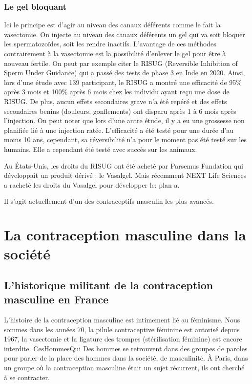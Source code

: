 \documentclass[12pt,a4paper]{report}
\begin{document}
\subsection{Le gel bloquant}

Ici le principe est d'agir au niveau des canaux déférents comme le fait la vasectomie. On injecte au niveau des canaux déférents un gel qui va soit bloquer les spermatozoïdes, soit les rendre inactifs.
L'avantage de ces méthodes contrairement à la vasectomie est la possibilité d'enlever le gel pour être à nouveau fertile.
On peut par exemple citer le RISUG (Reversible Inhibition of Sperm Under Guidance) qui a passé des tests de phase 3 en Inde en 2020. \cite{ContraceptionMasculineScience}
Ainsi, lors d'une étude avec 139 participant, le RISUG a montré une efficacité de 95\% après 3 mois et 100\% après 6 mois chez les individu ayant reçu une dose de RISUG. De plus, aucun effets secondaires grave n'a été repéré et des effets secondaires benins (douleurs, gonflements) ont disparu après 1 à 6 mois après l'injection. \cite{sharmaSafetyEfficacyIntravasal2019}
On peut noter que lors d'une autre étude, il y a eu une grossesse non planifiée lié à une injection ratée. \cite{RisugWikipedia}
L'efficacité a été testé pour une durée d'au moins 10 ans, cependant, sa réversibilité n'a pour le moment pas été testé sur les humains. Elle a cependant été testé avec succès sur les animaux. \cite{khilwaniRISUGMaleContraceptive2020}

Au États-Unis, les droits du RISUG ont été acheté par Parsemus Fundation qui développait un produit dérivé : le Vasalgel. Mais récemment NEXT Life Sciences a racheté les droits du Vasalgel pour développer le: plan a. \cites{ReversibleInhibitionSperm}{VasalgelMaleContraceptive}{PlanReversibleMale}

Il s'agit actuellement d'un des contraceptifs masculin les plus avancés. \cite{ContraceptionMasculineScience}

\chapter{La contraception masculine dans la société}

\section{L'historique militant de la contraception masculine en France} \label{section:militant}

L'histoire de la contraception masculine est intimement lié au féminisme.
Nous sommes dans les années 70, la pilule contraceptive féminine est autorisé depuis 1967, la vasectomie et la ligature des trompes (stérilisation féminine) est encore interdite. \cite{guillaumedaudinContraceptesEnqueteDernier2022}{CesHommesQui}
Des hommes se retrouvent dans des groupes de paroles pour parler de la place des hommes dans la société, de masculinité.
À Paris, dans un groupe où la contraception masculine était un sujet récurrent, ils ont cherché à se contracter.
\end{document}
